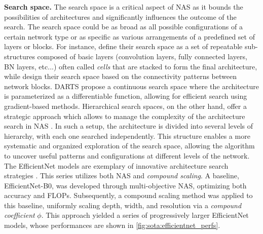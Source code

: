 \noindent\textbf{Search space.} The search space is a critical aspect of
\ac{NAS} as it bounds the possibilities of architectures and significantly
influences the outcome of the search. The search space could be as broad as all
possible configurations of a certain network type or as specific as various
arrangements of a predefined set of layers or blocks. For instance,
\cite{DBLP:conf/iclr/ZophL17} define their search space as a set of repeatable
sub-structures composed of basic layers (convolution layers, fully connected
layers, \ac{BN} layers, etc...) often called \emph{cells} that are stacked to
form the final architecture, while \cite{DBLP:conf/iclr/XieZLL19} design their
search space based on the connectivity patterns between network blocks. DARTS
\cite{DBLP:conf/iclr/LiuSY19} propose a continuous search space where the
architecture is parameterized as a differentiable function, allowing for
efficient search using gradient-based methods. Hierarchical search spaces, on
the other hand, offer a strategic approach which allows to manage the complexity
of the architecture search in \ac{NAS}
\cite{DBLP:conf/cvpr/LiuCSAHY019,DBLP:conf/cvpr/TanCPVSHL19}. In such a setup,
the architecture is divided into several levels of hierarchy, with each one
searched independently. This structure enables a more systematic and organized
exploration of the search space, allowing the algorithm to uncover useful
patterns and configurations at different levels of the network. The EfficientNet
models are exemplary of innovative architecture search strategies
\cite{DBLP:conf/icml/TanL19}. This series utilizes both \ac{NAS} and
\emph{compound scaling}. A baseline, EfficientNet-B0, was developed through
multi-objective \ac{NAS}, optimizing both accuracy and \acp{FLOP}. Subsequently,
a compound scaling method was applied to this baseline, uniformly scaling depth,
width, and resolution via a \emph{compound coefficient} $\phi$. This approach
yielded a series of progressively larger EfficientNet models, whose performances
are shown in \ref{fig:sota:efficientnet_perfs}.\\\


